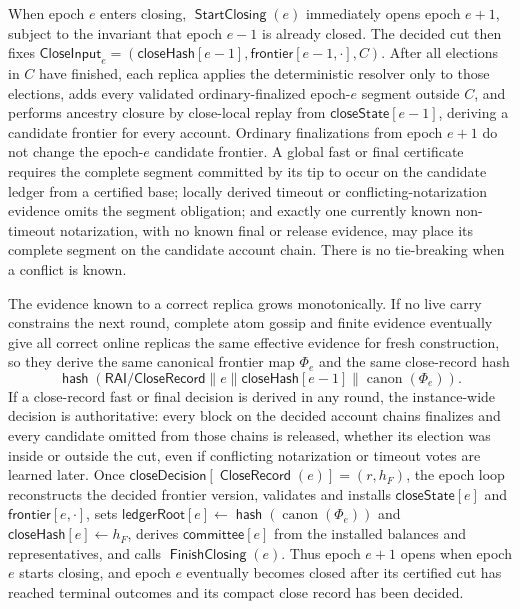 \documentclass[sigplan,twocolumn,review,anonymous]{acmart}
\newcommand{\func}[1]{\operatorname{\mathsf{#1}}}
\newcommand{\hash}{\func{hash}}
\newcommand{\CloseRecord}{\func{CloseRecord}}
\newcommand{\closeDecision}{\mathsf{closeDecision}}
\newcommand{\StartClosing}{\func{StartClosing}}
\newcommand{\FinishClosing}{\func{FinishClosing}}
\newcommand{\frontier}{\mathsf{frontier}}
\newcommand{\ledgerRoot}{\mathsf{ledgerRoot}}
\newcommand{\closeHash}{\mathsf{closeHash}}
\newcommand{\committee}{\mathsf{committee}}
\newcommand{\closeState}{\mathsf{closeState}}
\begin{document}
When epoch \(e\) enters closing, \(\StartClosing(e)\) immediately opens epoch \(e+1\), subject to
the invariant that epoch \(e-1\) is already closed.  The decided cut then fixes
\(\mathsf{CloseInput}_e=(\closeHash[e-1],\frontier[e-1,\cdot],C)\).  After all elections in \(C\) have
finished, each replica applies the deterministic resolver only to those elections, adds every validated
ordinary-finalized epoch-\(e\) segment outside \(C\), and performs ancestry closure by close-local replay
from \(\closeState[e-1]\), deriving a candidate frontier for every account.  Ordinary finalizations from
epoch \(e+1\) do not change the epoch-\(e\) candidate frontier.  A global fast or final certificate requires the complete segment committed by its tip to occur on the
candidate ledger from a certified base; locally derived timeout or conflicting-notarization evidence
omits the segment obligation; and exactly one currently known non-timeout notarization, with no known
final or release evidence, may place its complete segment on the candidate account chain.  There is no tie-breaking when a conflict is known.

The evidence known to a correct replica grows monotonically.  If no live carry constrains the next
round, complete atom gossip and finite evidence eventually give all correct online replicas the same
effective evidence for fresh construction, so they derive the same canonical frontier map \(\Phi_e\)
and the same close-record hash
\[
\hash(\mathsf{RAI/CloseRecord}\parallel e\parallel\closeHash[e-1]
\parallel\operatorname{canon}(\Phi_e)).
\]
If a close-record fast or final decision is derived in any round, the instance-wide decision is authoritative:
every block on the decided account chains finalizes and every candidate omitted from those chains is
released, whether its election was inside or outside the cut, even if conflicting notarization or timeout
votes are learned later.  Once
\(\closeDecision[\CloseRecord(e)]=(r,h_F)\), the epoch loop reconstructs the decided frontier version,
validates and installs \(\closeState[e]\) and \(\frontier[e,\cdot]\), sets
\(\ledgerRoot[e]\gets\hash(\operatorname{canon}(\Phi_e))\) and \(\closeHash[e]\gets h_F\), derives
\(\committee[e]\) from the installed balances and representatives, and calls \(\FinishClosing(e)\).  Thus epoch \(e+1\) opens when epoch \(e\)
starts closing, and epoch \(e\) eventually becomes closed after its certified cut has reached terminal
outcomes and its compact close record has been decided.
\end{document}
